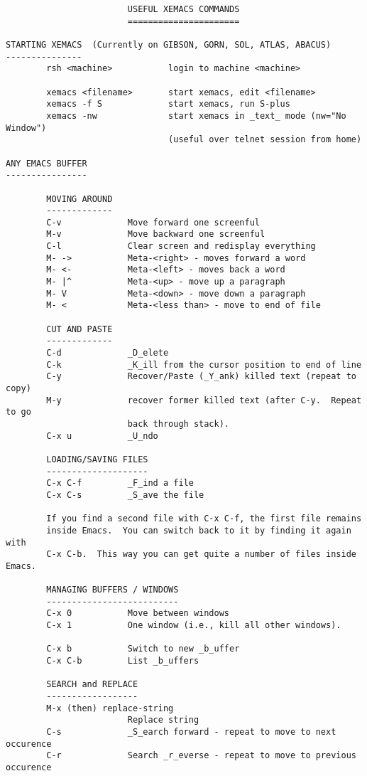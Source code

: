 \documentclass{article}
\begin{document}
\begin{verbatim}
                        USEFUL XEMACS COMMANDS
                        ======================

STARTING XEMACS  (Currently on GIBSON, GORN, SOL, ATLAS, ABACUS)
---------------
        rsh <machine>           login to machine <machine>

        xemacs <filename>       start xemacs, edit <filename>
        xemacs -f S             start xemacs, run S-plus
        xemacs -nw              start xemacs in _text_ mode (nw="No Window")
                                (useful over telnet session from home)

ANY EMACS BUFFER
----------------

        MOVING AROUND
        -------------
        C-v             Move forward one screenful
        M-v             Move backward one screenful
        C-l             Clear screen and redisplay everything
        M- ->           Meta-<right> - moves forward a word 
        M- <-           Meta-<left> - moves back a word
        M- |^           Meta-<up> - move up a paragraph
        M- V            Meta-<down> - move down a paragraph
        M- <            Meta-<less than> - move to end of file
        
        CUT AND PASTE
        -------------
        C-d             _D_elete
        C-k             _K_ill from the cursor position to end of line
        C-y             Recover/Paste (_Y_ank) killed text (repeat to copy) 
        M-y             recover former killed text (after C-y.  Repeat to go 
                        back through stack).
        C-x u           _U_ndo

        LOADING/SAVING FILES
        --------------------
        C-x C-f         _F_ind a file
        C-x C-s         _S_ave the file

        If you find a second file with C-x C-f, the first file remains
        inside Emacs.  You can switch back to it by finding it again with
        C-x C-b.  This way you can get quite a number of files inside Emacs.

        MANAGING BUFFERS / WINDOWS
        --------------------------
        C-x 0           Move between windows 
        C-x 1           One window (i.e., kill all other windows).

        C-x b           Switch to new _b_uffer
        C-x C-b         List _b_uffers

        SEARCH and REPLACE
        ------------------
        M-x (then) replace-string
                        Replace string
        C-s             _S_earch forward - repeat to move to next occurence
        C-r             Search _r_everse - repeat to move to previous occurence
                        

\end{verbatim}
\end{document}
